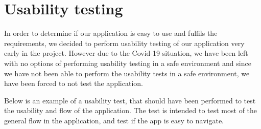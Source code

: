 \section{Usability testing}
In order to determine if our application is easy to use and fulfils the requirements, we decided to perform usability testing of our application very early in the project.
However due to the Covid-19 situation, we have been left with no options of performing usability testing in a safe environment and since we have not been able to perform the usability tests in a safe environment, we have been forced to not test the application.

Below is an example of a usability test, that should have been performed to test the usability and flow of the application. 
The test is intended to test most of the general flow in the application, and test if the app is easy to navigate. 

